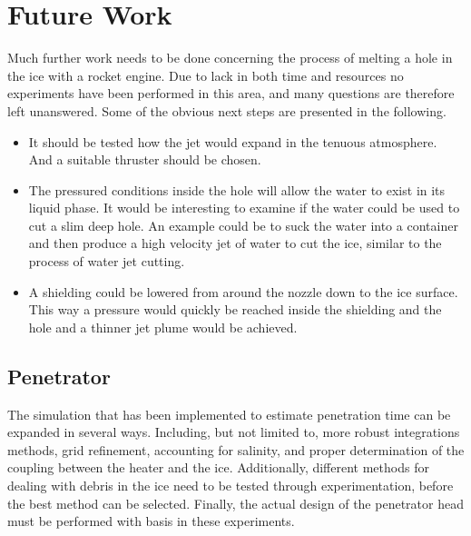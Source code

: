 \chapter{Future Work}


Much further work needs to be done concerning the process of melting a hole in the ice with a rocket engine. Due to lack in both time and resources no experiments have been performed in this area, and many questions are therefore left unanswered. Some of the obvious next steps are presented in the following.
\begin{itemize}
\item It should be tested how the jet would expand in the tenuous atmosphere. And a suitable thruster should be chosen.

\item The pressured conditions inside the hole will allow the water to exist in its liquid phase. It would be interesting to examine if the water could be used to cut a slim deep hole. An example could be to suck the water into a container and then produce a high velocity jet of water to cut the ice, similar to the process of water jet cutting.

\item A shielding could be lowered from around the nozzle down to the ice surface. This way a pressure would quickly be reached inside the shielding and the hole and a thinner jet plume would be achieved.
\end{itemize}

%



\section{Penetrator}
The simulation that has been implemented to estimate penetration time can be expanded in several ways. Including, but not limited to, more robust integrations methods, grid refinement, accounting for salinity, and proper determination of the coupling between the heater and the ice. Additionally, different methods for dealing with debris in the ice need to be tested through experimentation, before the best method can be selected. Finally, the actual design of the penetrator head must be performed with basis in these experiments.


